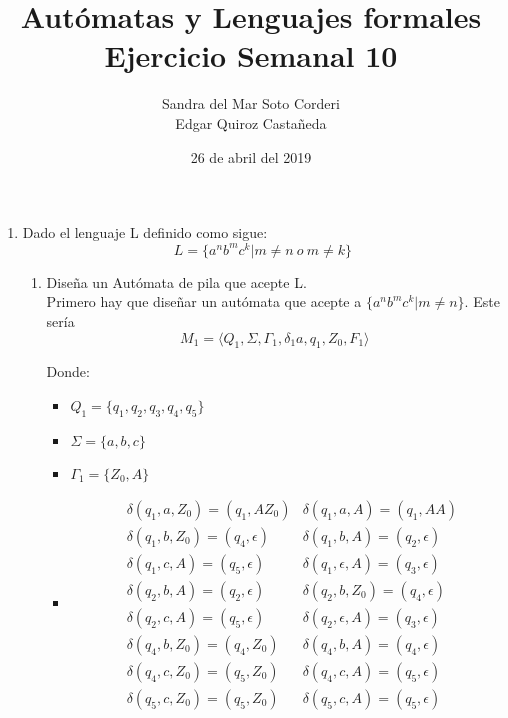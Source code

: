 \documentclass{article}
\begin{document}
    \title{
        Autómatas y Lenguajes formales \\
        Ejercicio Semanal 10
    }

    \author{
        Sandra del Mar Soto Corderi \\
        Edgar Quiroz Castañeda
    }

    \date{
        26 de abril del 2019
    }
    
    \maketitle

    \begin{enumerate}
        \item {
        Dado el lenguaje L definido como sigue:
        \begin{equation*}
        	L = \{a^nb^mc^k | m \neq n \ o \   m \neq k \}
        \end{equation*}
        
        
        \begin{enumerate}
        	\item {
        	Diseña un Autómata de pila que acepte L.\\
         	Primero hay que diseñar un autómata que acepte a $\{a^nb^mc^k | m \neq n \}$.
         	Este sería 
         	\[M_1 = \langle Q_1 , \Sigma, \Gamma_1 , \delta_1a, q_1 , Z_0,  F_1\rangle\]
         
	         Donde:
	         
	         \begin{itemize}
	         	\item {
	         		$Q_1 = \{q_1, q_2, q_3, q_4, q_5\}$
	         	}
	         	\item {
	         		$\Sigma = \{a, b,c\}$
	         	}
	         	\item {
	         		$\Gamma_1 = \{Z_0, A\}$
	         	}
	         	        					 
				\item {     		
					\begin{align*}
						&\delta (q_1, a, Z_0) = (q_1, AZ_0)
						&\delta (q_1, a, A) = (q_1, AA) \\
						&\delta (q_1, b, Z_0) = (q_4, \epsilon)
						&\delta (q_1, b, A) = (q_2, \epsilon) \\
						&\delta (q_1, c, A) = (q_5, \epsilon)
						&\delta (q_1, \epsilon, A) = (q_3, \epsilon) \\
						&\delta (q_2, b, A) = (q_2, \epsilon)
						&\delta (q_2, b, Z_0) = (q_4, \epsilon) \\
						&\delta (q_2, c, A) = (q_5, \epsilon)
						&\delta (q_2, \epsilon, A) = (q_3, \epsilon) \\
						&\delta (q_4, b, Z_0) = (q_4, Z_0)
						&\delta (q_4, b, A) = (q_4, \epsilon) \\
						&\delta (q_4, c, Z_0) = (q_5, Z_0)
						&\delta (q_4, c, A) = (q_5, \epsilon) \\
						&\delta (q_5, c, Z_0) = (q_5, Z_0)
						&\delta (q_5, c, A) = (q_5, \epsilon)
	         		\end{align*}
				}
				 

\end{itemize}}
\end{enumerate}}
\end{enumerate}
\end{document}
